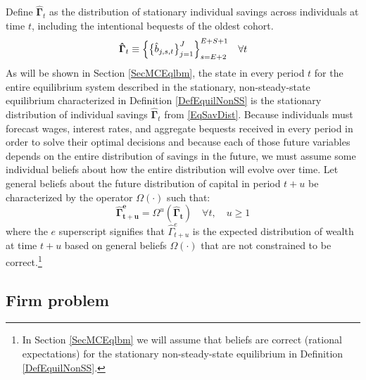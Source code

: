 \documentclass[letterpaper,12pt]{article}
\theoremstyle{definition}
\begin{document}
\begin{spacing}{1.5}
    Define $\bm{\hat{\Gamma}}_t$ as the distribution of stationary individual savings across individuals at time $t$, including the intentional bequests of the oldest cohort.
    \begin{equation}\label{EqSavDist}
      \bm{\hat{\Gamma}}_t \equiv \Bigl\{\bigl\{\hat{b}_{j,s,t}\bigr\}_{j=1}^J\Bigr\}_{s=E+2}^{E+S+1} \quad\forall t
    \end{equation}
    As will be shown in Section \ref{SecMCEqlbm}, the state in every period $t$ for the entire equilibrium system described in the stationary, non-steady-state equilibrium characterized in Definition \ref{DefEquilNonSS} is the stationary distribution of individual savings $\bm{\hat{\Gamma}}_t$ from \eqref{EqSavDist}. Because individuals must forecast wages, interest rates, and aggregate bequests received in every period in order to solve their optimal decisions and because each of those future variables depends on the entire distribution of savings in the future, we must assume some individual beliefs about how the entire distribution will evolve over time. Let general beliefs about the future distribution of capital in period $t+u$ be characterized by the operator $\Omega(\cdot)$ such that:
    \begin{equation}\label{EqBeliefs}
      \bm{\hat{\Gamma}^e_{t+u}} = \Omega^u\left(\bm{\hat{\Gamma}_t}\right) \quad \forall t, \quad u\geq 1
    \end{equation}
    where the $e$ superscript signifies that $\hat{\Gamma}^e_{t+u}$ is the expected distribution of wealth at time $t+u$ based on general beliefs $\Omega(\cdot)$ that are not constrained to be correct.\footnote{In Section \ref{SecMCEqlbm} we will assume that beliefs are correct (rational expectations) for the stationary non-steady-state equilibrium in Definition \ref{DefEquilNonSS}.}


  \subsection{Firm problem}\label{SecFirms}


\end{spacing}
\end{document}
